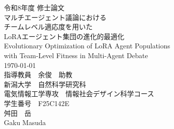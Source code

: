 \documentclass[12pt, a4j, dvipdfmx]{jreport}
\begin{document}
\thispagestyle{empty}

\begin{center}
\large{令和8年度 修士論文}\\ %
\vspace{5cm}
\Large{マルチエージェント議論における\\チームレベル適応度を用いた\\LoRAエージェント集団の進化的最適化}\\
\vspace{5mm}
\normalsize{Evolutionary Optimization of LoRA Agent Populations\\ with Team-Level Fitness in Multi-Agent Debate}\\
\vspace{4cm}
\today
\\
\large{指導教員　余俊　助教}\\ %
\vspace{1cm}
\large{新潟大学　自然科学研究科\\電気情報工学専攻　情報社会デザイン科学コース}\\
\vspace{10mm}
\large{学生番号　F25C142E}\\
\large{舛田　岳}\\
\large{Gaku Masuda}\\
\vspace{10mm}
\end{center}

\clearpage
\phantom{s}\thispagestyle{empty}
\clearpage

\pagestyle{empty}





\tableofcontents









\end{document}
